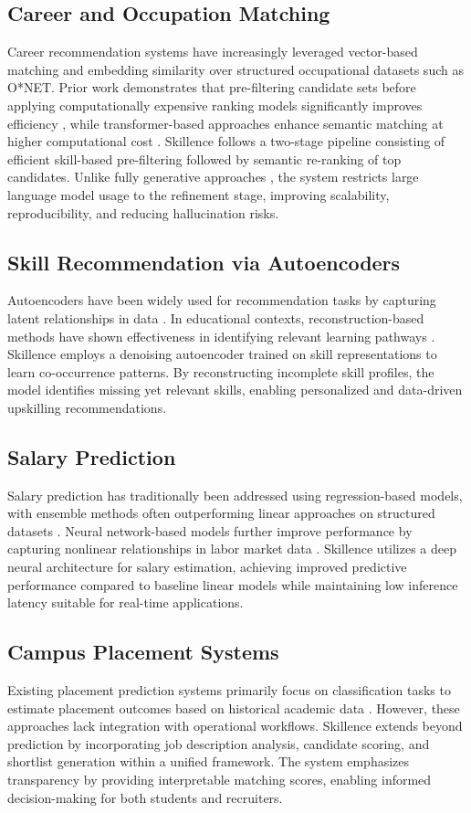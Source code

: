 \documentclass[conference]{IEEEtran}
\begin{document}
\subsection{Career and Occupation Matching}
Career recommendation systems have increasingly leveraged vector-based matching and embedding similarity over structured occupational datasets such as O*NET. Prior work demonstrates that pre-filtering candidate sets before applying computationally expensive ranking models significantly improves efficiency \cite{sicilia2025}, while transformer-based approaches enhance semantic matching at higher computational cost \cite{alonso2025}. Skillence follows a two-stage pipeline consisting of efficient skill-based pre-filtering followed by semantic re-ranking of top candidates. Unlike fully generative approaches \cite{zheng2023}, the system restricts large language model usage to the refinement stage, improving scalability, reproducibility, and reducing hallucination risks.

\subsection{Skill Recommendation via Autoencoders}
Autoencoders have been widely used for recommendation tasks by capturing latent relationships in data \cite{ferreira2020}. In educational contexts, reconstruction-based methods have shown effectiveness in identifying relevant learning pathways \cite{rahayu2023}. Skillence employs a denoising autoencoder trained on skill representations to learn co-occurrence patterns. By reconstructing incomplete skill profiles, the model identifies missing yet relevant skills, enabling personalized and data-driven upskilling recommendations.

\subsection{Salary Prediction}
Salary prediction has traditionally been addressed using regression-based models, with ensemble methods often outperforming linear approaches on structured datasets \cite{matbouli2022}. Neural network-based models further improve performance by capturing nonlinear relationships in labor market data \cite{kablaoui2022}. Skillence utilizes a deep neural architecture for salary estimation, achieving improved predictive performance compared to baseline linear models while maintaining low inference latency suitable for real-time applications.

\subsection{Campus Placement Systems}
Existing placement prediction systems primarily focus on classification tasks to estimate placement outcomes based on historical academic data \cite{shahane2022}. However, these approaches lack integration with operational workflows. Skillence extends beyond prediction by incorporating job description analysis, candidate scoring, and shortlist generation within a unified framework. The system emphasizes transparency by providing interpretable matching scores, enabling informed decision-making for both students and recruiters.
\end{document}
